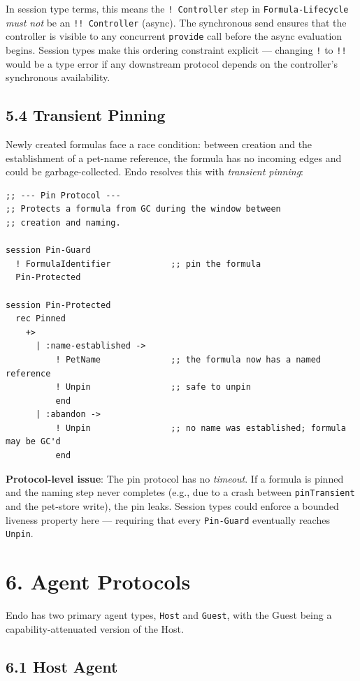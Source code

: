 \documentclass[11pt]{article}
\begin{document}
In session type terms, this means the \texttt{! Controller} step in
\texttt{Formula-Lifecycle} \emph{must not} be an \texttt{!! Controller} (async). The
synchronous send ensures that the controller is visible to any concurrent
\texttt{provide} call before the async evaluation begins. Session types make this
ordering constraint explicit --- changing \texttt{!} to \texttt{!!}  would be a type error
if any downstream protocol depends on the controller's synchronous
availability.
\subsection{5.4 Transient Pinning}
\label{sec:org939cf00}

Newly created formulas face a race condition: between creation and the
establishment of a pet-name reference, the formula has no incoming edges and
could be garbage-collected. Endo resolves this with \emph{transient pinning}:

\begin{verbatim}
;; --- Pin Protocol ---
;; Protects a formula from GC during the window between
;; creation and naming.

session Pin-Guard
  ! FormulaIdentifier            ;; pin the formula
  Pin-Protected

session Pin-Protected
  rec Pinned
    +>
      | :name-established ->
          ! PetName              ;; the formula now has a named reference
          ! Unpin                ;; safe to unpin
          end
      | :abandon ->
          ! Unpin                ;; no name was established; formula may be GC'd
          end
\end{verbatim}

\textbf{Protocol-level issue}: The pin protocol has no \emph{timeout}. If a formula is
pinned and the naming step never completes (e.g., due to a crash between
\texttt{pinTransient} and the pet-store write), the pin leaks. Session types could
enforce a bounded liveness property here --- requiring that every
\texttt{Pin-Guard} eventually reaches \texttt{Unpin}.
\section{6. Agent Protocols}
\label{sec:org84f5bd2}

Endo has two primary agent types, \texttt{Host} and \texttt{Guest}, with the Guest being
a capability-attenuated version of the Host.
\subsection{6.1 Host Agent}
\label{sec:org95c18bd}
\end{document}
